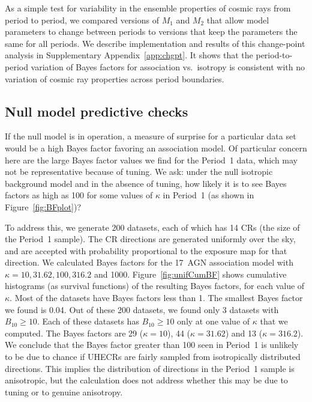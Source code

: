 As a simple test for variability in the ensemble properties of cosmic rays
from period to period, we compared versions of $M_1$ and $M_2$ that allow
model parameters to change between periods to versions that keep the
parameters the same for all periods.  We describe implementation and results
of this change-point analysis in Supplementary Appendix~\ref{app:chgpt}.  
It shows that the period-to-period variation of Bayes factors for
association vs.\ isotropy is consistent with no variation of cosmic ray
properties across period boundaries.

\subsection{Null model predictive checks}

If the null model is in operation, a measure of surprise for a particular data
set would be a high Bayes factor favoring an association model.  Of particular
concern here are the large Bayes factor values we find for the Period~1 data,
which may not be representative because of tuning.  We ask:  under the null
isotropic background model and in the absence of tuning, how likely it is to
see Bayes factors as high as 100 for some values of $\kappa$ in Period~1 (as
shown in Figure~\ref{fig:BFplot})?

To address this, we generate 200 datasets, each of which has 14 CRs (the
size of the Period~1 sample).  The CR
directions are generated uniformly over the sky, and are accepted with
probability proportional to the exposure map for that direction.  We
calculated Bayes factors for the 17~AGN association model with $\kappa = 10,
31.62, 100, 316.2$ and 1000.
Figure~\ref{fig:unifCumBF} shows cumulative histograms (as survival
functions) of the resulting Bayes factors, for each value of $\kappa$.  Most
of the datasets have Bayes factors less than 1. The smallest Bayes factor we
found is 0.04. Out of these 200 datasets, we found only 3 datasets with
$B_{10} \geq 10$.  Each of these datasets has $B_{10} \geq 10$ only at one
value of $\kappa$ that we computed. The Bayes factors are 29 ($\kappa=10$),
44 ($\kappa = 31.62$) and 13 ($\kappa = 316.2$).  We conclude that the Bayes
factor greater than 100 seen in Period~1 is unlikely to be due to chance if
UHECRs are fairly sampled from isotropically distributed directions.  This
implies the distribution of directions in the Period~1 sample is
anisotropic, but the calculation does not address whether this may be due to
tuning or to genuine anisotropy.

